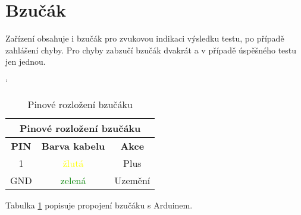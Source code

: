 
\section{Bzučák}
Zařízení obsahuje i bzučák pro zvukovou indikaci výsledku testu, po případě zahlášení chyby. Pro chyby zabzučí bzučák dvakrát a v případě úspěšného testu jen jednou.

\begin{table} [H]
	\caption{Pinové rozložení bzučáku}
	\label{table:pinSP}
	\centering
	\catcode` %
	\begin{tabular}[c]{|| c | c | c ||}
	\hline
		\multicolumn{3}{||c||}{Pinové rozložení bzučáku} \\
	\hline
 		\textbf{PIN} & \textbf{Barva kabelu} & \textbf{Akce} \\
	\hline
		1 & \textcolor{yellow}{žlutá}  &  Plus \\
	\hline
		GND & \textcolor{green}{zelená} & Uzemění \\
	\hline
	\end{tabular}
\end{table}

Tabulka \ref{table:pinSP} popisuje propojení bzučáku s Arduinem.
